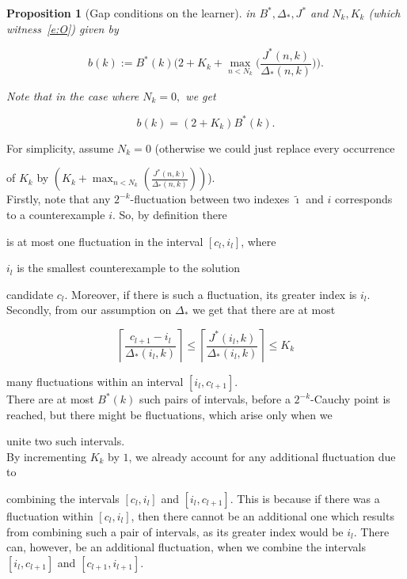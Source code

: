 \documentclass[1p]{elsarticle}
\theoremstyle{plain}
\newtheorem{prop}[thm]{Proposition}
\theoremstyle{definition}
\theoremstyle{remark}
\renewenvironment{proof}[1][]{\noindent{\bf Proof{#1}. }}{\nopagebreak[4]{\hspace*{\fill}


  $\Box$              %

 }{\vspace{2ex}}}
\theoremstyle{definition}
\begin{document}
{\begin{prop}[{Gap conditions on the learner}]
in $B^*,\Delta_*,J^*$ and $N_k,K_k$ (which witness~\eqref{e:O}) given by

\[b(k):=B^*(k)\bigg(2+K_k+\max_{n<N_k}\Big(\frac{J^*(n,k)}{\Delta_*(n,k)}\Big)\bigg).\]

Note that in the case where $N_k=0,$ we get

\[b(k)=(2+K_k)B^*(k).\]

\end{prop}

\begin{proof}

For simplicity, assume $N_k=0$ (otherwise we could just replace every occurrence 

of $K_k$ by $(K_k+\max_{n<N_k}(\frac{J^*(n,k)}{\Delta_*(n,k)}))$).\\

Firstly, note that any $2^{-k}$-fluctuation between two indexes $\tilde{\imath}$ and $i$ corresponds to a counterexample $i$. So, by definition there 

is at most one fluctuation in the interval $[c_l,i_l]$, where 

$i_l$ is the smallest counterexample to the solution 

candidate $c_l$. Moreover, if there is such a fluctuation, its greater index is $i_l$.\\

Secondly, from our assumption on $\Delta_*$ we get that there are at most

\[

\left\lceil \frac{c_{l+1}-i_l}{\Delta_*(i_l,k)} \right\rceil \leq \left\lceil \frac{J^*(i_l,k)}{\Delta_*(i_l,k)} \right\rceil \leq K_k

\]

many fluctuations within an interval $[i_l,c_{l+1}]$.\\

There are at most $B^*(k)$ such pairs of intervals, before a $2^{-k}$-Cauchy point is reached, but there might be fluctuations, which arise only when we

unite two such intervals.\\

By incrementing $K_k$ by $1$, we already account for any additional fluctuation due to

combining the intervals $[c_l,i_l]$ and $[i_l,c_{l+1}]$. This is because if there was a fluctuation within $[c_l,i_l]$, then there cannot be an additional one which results from combining such a pair of intervals, as its greater index would be $i_l$. There can, however, be an additional fluctuation, when we combine the intervals $[i_l,c_{l+1}]$ and $[c_{l+1},i_{l+1}]$.\\


\end{proof}}
\end{document}
